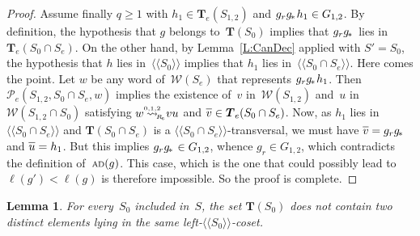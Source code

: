 \documentclass{amsart}
\numberwithin{equation}{section}
\theoremstyle{plain}
\newtheorem{lemm}[prop]{Lemma}
\theoremstyle{definition}
\let\ge=\geqslant
\begin{document}
\begin{proof}
Assume finally ${q} \ge 1$ with ${h}_1 \in {\boldsymbol{T}}_{e}({S}_{1,2})$ and ${g}_{r} {{g}_{\hspace{-0.2ex}*\hspace{0.2ex}}} {h}_1 \in {G}_{1,2}$. By definition, the hypothesis that ${g}$ belongs to~${\boldsymbol{T}}({S}_0)$ implies that ${g}_{r} {{g}_{\hspace{-0.2ex}*\hspace{0.2ex}}}$ lies in~${\boldsymbol{T}}_{e}({S}_0 \cap {S}_{e})$. On the other hand, by Lemma~\ref{L:CanDec} applied with ${S}' = {S}_0$, the hypothesis that ${h}$ lies in~${\langle\!\langle{{{S}_0}}\rangle\!\rangle}$ implies that ${h}_1$ lies in~${\langle\!\langle{{{S}_0 \cap {S}_{e}}}\rangle\!\rangle}$. Here comes the point. Let ${w}$ be any word of~${\mathcal{W}({{S}_{e}})}$ that represents ${g}_{r} {{g}_{\hspace{-0.2ex}*\hspace{0.2ex}}} {h}_1$. Then ${\mathcal{P}_{\!e}({{S}_{1,2}}, {{S}_0 \cap {S}_{e}}, {w})}$ implies the existence of~${v}$ in~${\mathcal{W}({{S}_{1,2}})}$ and~${u}$ in~${\mathcal{W}({{S}_{1,2} \cap {S}_0})}$ satisfying ${w} {\mathrel{{\mathrel{\overset{\scriptscriptstyle 0,1,2}{\rightsquigarrow}}}_{\hspace{-0.9ex}{\scriptscriptstyle R}_{\hspace{-0.2ex}e}}}} {v} {u}$ and ${\overline{\vrule width0pt height5pt{v}}} \in {\boldsymbol{T}}_{e}({S}_0 \cap {S}_{e})$. Now, as ${h}_1$ lies in~${\langle\!\langle{{{S}_0 \cap {S}_{e}}}\rangle\!\rangle}$ and ${\boldsymbol{T}}({S}_0 \cap {S}_{e})$ is a ${\langle\!\langle{{{S}_0 \cap {S}_{e}}}\rangle\!\rangle}$-transversal, we must have ${\overline{\vrule width0pt height5pt{v}}} = {g}_{r} {{g}_{\hspace{-0.2ex}*\hspace{0.2ex}}}$ and ${\overline{\vrule width0pt height5pt{u}}} = {h}_1$. But this implies ${g}_{r} {{g}_{\hspace{-0.2ex}*\hspace{0.2ex}}} \in {G}_{1,2}$, whence ${g}_{r} \in {G}_{1,2}$, which contradicts the definition of~${{\scriptstyle\mathrm{A\hspace{-0.1ex}D}}({g})}$. This case, which is the one that could possibly lead to ${\ell({{g}'})} < {\ell({g})}$ is therefore impossible. So the proof is complete.
\end{proof}

\begin{lemm}
\label{L:Transversal}
For every~${S}_0$ included in~${S}$, the set ${\boldsymbol{T}}({S}_0)$ does not contain two distinct elements lying in the same left-${\langle\!\langle{{{S}_0}}\rangle\!\rangle}$-coset.
\end{lemm}
\end{document}
